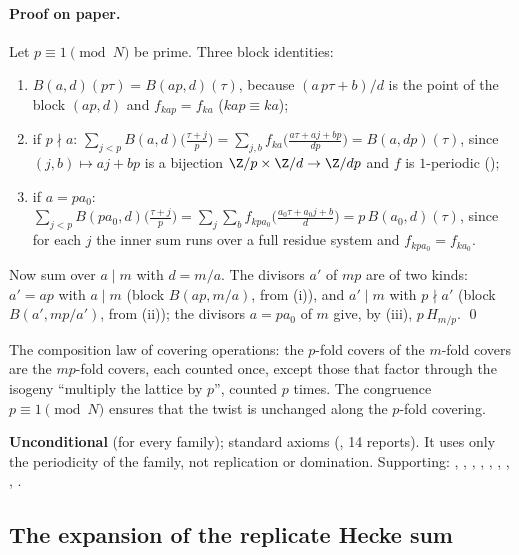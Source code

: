 \paragraph{Proof on paper.}  Let $p\equiv1\pmod N$ be prime.  Three block identities:
\begin{enumerate}[label=(\roman*)]
\item $B(a,d)(p\tau)=B(ap,d)(\tau)$, because $(a\,p\tau+b)/d$ is the point of the block $(ap,d)$ and $f_{kap}=f_{ka}$ ($kap\equiv ka$);
\item if $p\nmid a$: $\sum_{j<p}B(a,d)\bigl(\frac{\tau+j}p\bigr)=\sum_{j,b}f_{ka}\bigl(\frac{a\tau+aj+bp}{dp}\bigr)=B(a,dp)(\tau)$, since
  $(j,b)\mapsto aj+bp$ is a bijection $\Z/p\times\Z/d\to\Z/dp$ and $f$ is $1$-periodic ();
\item if $a=pa_0$: $\sum_{j<p}B(pa_0,d)\bigl(\frac{\tau+j}p\bigr)=\sum_j\sum_bf_{kpa_0}\bigl(\frac{a_0\tau+a_0j+b}d\bigr)=p\,B(a_0,d)(\tau)$, since for each
  $j$ the inner sum runs over a full residue system and $f_{kpa_0}=f_{ka_0}$.
\end{enumerate}
Now sum over $a\mid m$ with $d=m/a$.  The divisors $a'$ of $mp$ are of two kinds: $a'=ap$ with $a\mid m$ (block
$B(ap,m/a)$, from (i)), and $a'\mid m$ with $p\nmid a'$ (block $B(a',mp/a')$, from (ii)); the divisors $a=pa_0$ of $m$ give, by
(iii), $p\,H_{m/p}$. \qed
\begin{physics}The composition law of covering operations: the $p$-fold covers of the $m$-fold covers are the $mp$-fold
covers, each counted once, except those that factor through the isogeny ``multiply the lattice by $p$'', counted $p$ times.
The congruence $p\equiv1\pmod N$ ensures that the twist is unchanged along the $p$-fold covering.\end{physics}
\begin{status}\textbf{Unconditional} (for every family); standard axioms (, 14
reports).  It uses only the periodicity of the family, not replication or domination.  Supporting: ,
, , ,
, , ,
, .\end{status}

\subsection{The expansion of the replicate Hecke sum}

